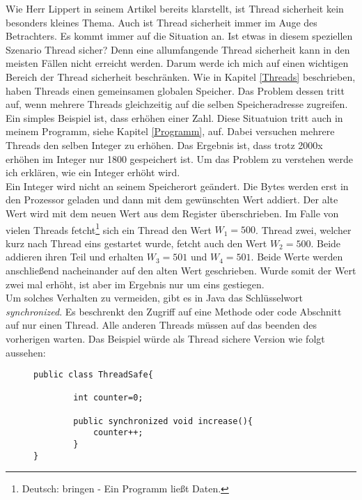Wie Herr Lippert in seinem Artikel bereits klarstellt, ist Thread sicherheit kein besonders kleines Thema. Auch ist Thread sicherheit immer im Auge des Betrachters. Es kommt immer auf die Situation an. Ist etwas in diesem speziellen Szenario Thread sicher? Denn eine allumfangende Thread sicherheit kann in den meisten Fällen nicht erreicht werden. Darum werde ich mich auf einen wichtigen Bereich der Thread sicherheit beschränken.
\medskip
\newline
Wie in Kapitel \ref{Threads} beschrieben, haben Threads einen gemeinsamen globalen Speicher. Das Problem dessen tritt auf, wenn mehrere Threads gleichzeitig auf die selben Speicheradresse zugreifen. Ein simples Beispiel ist, dass erhöhen einer Zahl. Diese Situatuion tritt auch in meinem Programm, siehe Kapitel \ref{Programm}, auf. Dabei versuchen mehrere Threads den selben Integer zu erhöhen. Das Ergebnis ist, dass trotz 2000x erhöhen im Integer nur 1800 gespeichert ist. Um das Problem zu verstehen werde ich erklären, wie ein Integer erhöht wird.\\
Ein Integer wird nicht an seinem Speicherort geändert. Die Bytes werden erst in den Prozessor geladen und dann mit dem gewünschten Wert addiert. Der alte Wert wird mit dem neuen Wert aus dem Register überschrieben. Im Falle von vielen Threads fetcht\footnote{Deutsch: bringen - Ein Programm ließt Daten.} sich ein Thread den Wert $W_1 = 500$. Thread zwei, welcher kurz nach Thread eins gestartet wurde, fetcht auch den Wert $W_2 = 500$. Beide addieren ihren Teil und erhalten $W_3 = 501$ und $W_4 = 501$. Beide Werte werden anschließend nacheinander auf den alten Wert geschrieben. Wurde somit der Wert zwei mal erhöht, ist aber im Ergebnis nur um eins gestiegen.\cite{ThreadInterference:Oracle}\\
Um solches Verhalten zu vermeiden, gibt es in Java das Schlüsselwort \textit{synchronized}. Es beschrenkt den Zugriff auf eine Methode oder code Abschnitt auf nur einen Thread. Alle anderen Threads müssen auf das beenden des vorherigen warten. Das Beispiel würde als Thread sichere Version wie folgt aussehen: \cite{SynchronizedMethods:Oracle}
\begin{figure}[h]
    \begin{lstlisting}
public class ThreadSafe{

        int counter=0;

        public synchronized void increase(){
            counter++;
        }
}
    \end{lstlisting}
\end{figure}